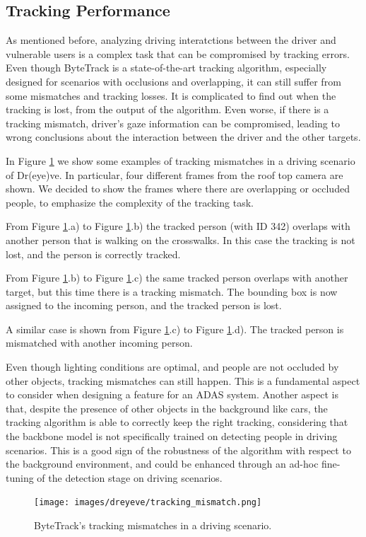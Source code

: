\subsection{Tracking Performance}
As mentioned before, analyzing driving interatctions between the driver and 
vulnerable users is a complex task that can be compromised by tracking errors.
Even though ByteTrack is a state-of-the-art tracking algorithm, especially 
designed for scenarios with occlusions and overlapping, it can still suffer 
from some mismatches and tracking losses.
It is complicated to find out when the tracking is lost, from the output of 
the algorithm. Even worse, if there is a tracking mismatch, driver's gaze 
information can be compromised, leading to wrong conclusions about the interaction 
between the driver and the other targets.

In Figure \ref{fig:tracking_mismatch} we show some examples of tracking mismatches
in a driving scenario of Dr(eye)ve.
In particular, four different frames from the roof top camera are shown. 
We decided to show the frames where there are overlapping or occluded people, 
to emphasize the complexity of the tracking task.

From Figure \ref{fig:tracking_mismatch}.a) to Figure \ref{fig:tracking_mismatch}.b)
the tracked person (with ID 342) overlaps with another person that is walking on 
the crosswalks. In this case the tracking is not lost, and the person is correctly 
tracked.

From Figure \ref{fig:tracking_mismatch}.b) to Figure \ref{fig:tracking_mismatch}.c)
the same tracked person overlaps with another target, but this time there is 
a tracking mismatch. The bounding box is now assigned to the incoming person, 
and the tracked person is lost.

A similar case is shown from Figure \ref{fig:tracking_mismatch}.c) to 
Figure \ref{fig:tracking_mismatch}.d). The tracked person is mismatched with 
another incoming person.

Even though lighting conditions are optimal, and people are not occluded by 
other objects, tracking mismatches can still happen. This is a fundamental 
aspect to consider when designing a feature for an ADAS system. 
Another aspect is that, despite the presence of other objects in the background 
like cars, the tracking algorithm is able to correctly keep the right tracking, 
considering that the backbone model is not specifically trained on detecting 
people in driving scenarios. This is a good sign of the robustness of the 
algorithm with respect to the background environment, and could be enhanced 
through an ad-hoc fine-tuning of the detection stage on driving scenarios.
\begin{figure}
\centering
\texttt{[image: images/dreyeve/tracking\_mismatch.png]}
\vspace{0.4cm}
\caption{ByteTrack's tracking mismatches in a driving scenario.}
\label{fig:tracking_mismatch}
\end{figure}

